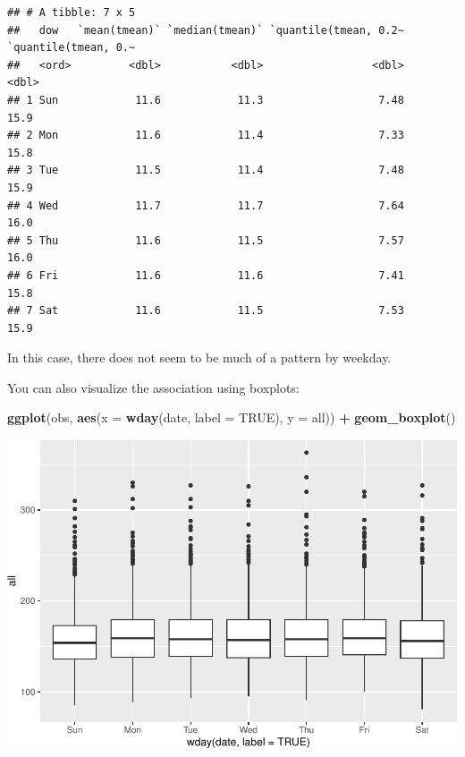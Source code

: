 \documentclass[
]{book}
\newenvironment{Shaded}{\begin{snugshade}}{\end{snugshade}}
\newcommand{\DataTypeTok}[1]{\textcolor[rgb]{0.13,0.29,0.53}{#1}}
\newcommand{\KeywordTok}[1]{\textcolor[rgb]{0.13,0.29,0.53}{\textbf{#1}}}
\newcommand{\NormalTok}[1]{#1}
\newcommand{\OperatorTok}[1]{\textcolor[rgb]{0.81,0.36,0.00}{\textbf{#1}}}
\newcommand{\OtherTok}[1]{\textcolor[rgb]{0.56,0.35,0.01}{#1}}
\newcommand{\StringTok}[1]{\textcolor[rgb]{0.31,0.60,0.02}{#1}}
\begin{document}
\begin{verbatim}
## # A tibble: 7 x 5
##   dow   `mean(tmean)` `median(tmean)` `quantile(tmean, 0.2~ `quantile(tmean, 0.~
##   <ord>         <dbl>           <dbl>                 <dbl>                <dbl>
## 1 Sun            11.6            11.3                  7.48                 15.9
## 2 Mon            11.6            11.4                  7.33                 15.8
## 3 Tue            11.5            11.4                  7.48                 15.9
## 4 Wed            11.7            11.7                  7.64                 16.0
## 5 Thu            11.6            11.5                  7.57                 16.0
## 6 Fri            11.6            11.6                  7.41                 15.8
## 7 Sat            11.6            11.5                  7.53                 15.9
\end{verbatim}

In this case, there does not seem to be much of a pattern by weekday.

You can also visualize the association using boxplots:

\begin{Shaded}
\begin{Highlighting}[]
\KeywordTok{ggplot}\NormalTok{(obs, }\KeywordTok{aes}\NormalTok{(}\DataTypeTok{x =} \KeywordTok{wday}\NormalTok{(date, }\DataTypeTok{label =} \OtherTok{TRUE}\NormalTok{), }\DataTypeTok{y =}\NormalTok{ all)) }\OperatorTok{+}\StringTok{ }
\StringTok{  }\KeywordTok{geom_boxplot}\NormalTok{()}
\end{Highlighting}
\end{Shaded}

\includegraphics{adv_epi_analysis_files/figure-latex/unnamed-chunk-21-1.pdf}
\end{document}
